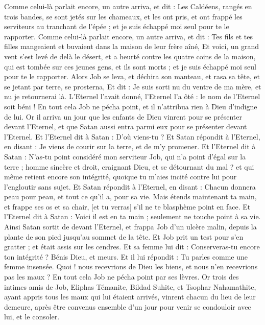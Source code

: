 \begin{multicols}{2}
Comme celui-là parlait encore, un autre arriva, et dit : Les Caldéens, rangés en trois bandes, se sont jetés sur les chameaux, et les ont pris, et ont frappé les serviteurs au tranchant de l'épée ; et je suis échappé moi seul pour te le rapporter.
Comme celui-là parlait encore, un autre arriva, et dit : Tes fils et tes filles mangeaient et buvaient dans la maison de leur frère aîné,
Et voici, un grand vent s'est levé de delà le désert, et a heurté contre les quatre coins de la maison, qui est tombée sur ces jeunes gens, et ils sont morts ; et je suis échappé moi seul pour te le rapporter.
Alors Job se leva, et déchira son manteau, et rasa sa tête, et se jetant par terre, se prosterna,
Et dit : Je suis sorti nu du ventre de ma mère, et nu je retournerai là. L'Eternel l'avait donné, l'Eternel l'a ôté : le nom de l'Eternel soit béni !
En tout cela Job ne pécha point, et il n'attribua rien à Dieu d'indigne de lui.
\VerseOne{}Or il arriva un jour que les enfants de Dieu vinrent pour se présenter devant l'Eternel, et que Satan aussi entra parmi eux pour se présenter devant l'Eternel.
Et l'Eternel dit à Satan : D'où viens-tu ? Et Satan répondit à l'Eternel, en disant : Je viens de courir sur la terre, et de m'y promener.
Et l'Eternel dit à Satan : N'as-tu point considéré mon serviteur Job, qui n'a point d'égal sur la terre ; homme sincère et droit, craignant Dieu, et se détournant du mal ? et qui même retient encore son intégrité, quoique tu m'aies incité contre lui pour l'engloutir sans sujet.
Et Satan répondit à l'Eternel, en disant : Chacun donnera peau pour peau, et tout ce qu'il a, pour sa vie.
Mais étends maintenant ta main, et frappe ses os et sa chair, [et tu verras] s'il ne te blasphème point en face.
Et l'Eternel dit à Satan : Voici il est en ta main ; seulement ne touche point à sa vie.
Ainsi Satan sortit de devant l'Eternel, et frappa Job d'un ulcère malin, depuis la plante de son pied jusqu'au sommet de la tête.
Et Job prit un test pour s'en gratter ; et était assis sur les cendres.
Et sa femme lui dit : Conserveras-tu encore ton intégrité ? Bénis Dieu, et meurs.
Et il lui répondit : Tu parles comme une femme insensée. Quoi ! nous recevrions de Dieu les biens, et nous n'en recevrions pas les maux ? En tout cela Job ne pécha point par ses lèvres.
Or trois des intimes amis de Job, Eliphas Témanite, Bildad Suhite, et Tsophar Nahamathite, ayant appris tous les maux qui lui étaient arrivés, vinrent chacun du lieu de leur demeure, après être convenus ensemble d'un jour pour venir se condouloir avec lui, et le consoler.

\end{multicols}
